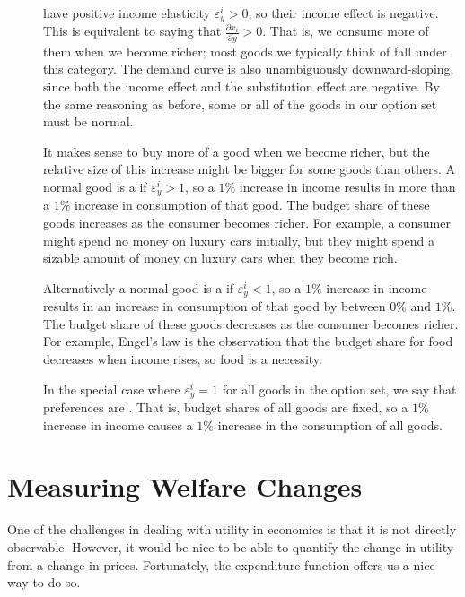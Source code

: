 \begin{description}
\item[] have positive income elasticity $\varepsilon_y^i > 0$, so their income effect is negative. This is equivalent to saying that $\frac{\partial x_i}{\partial y} > 0$. That is, we consume more of them when we become richer; most goods we typically think of fall under this category. The demand curve is also unambiguously downward-sloping, since both the income effect and the substitution effect are negative. By the same reasoning as before, some or all of the goods in our option set must be normal.

It makes sense to buy more of a good when we become richer, but the relative size of this increase might be bigger for some goods than others. A normal good is a  if $\varepsilon_y^i > 1$, so a $1\%$ increase in income results in more than a $1\%$ increase in consumption of that good. The budget share of these goods increases as the consumer becomes richer. For example, a consumer might spend no money on luxury cars initially, but they might spend a sizable amount of money on luxury cars when they become rich.

Alternatively a normal good is a  if $\varepsilon_y^i < 1$, so a $1\%$ increase in income results in an increase in consumption of that good by between $0\%$ and $1\%$. The budget share of these goods decreases as the consumer becomes richer. For example, Engel's law is the observation that the budget share for food decreases when income rises, so food is a necessity.

In the special case where $\varepsilon_y^i = 1$ for all goods in the option set, we say that preferences are . That is, budget shares of all goods are fixed, so a $1\%$ increase in income causes a $1\%$ increase in the consumption of all goods.

\end{description}


\section{Measuring Welfare Changes}
One of the challenges in dealing with utility in economics is that it is not directly observable. However, it would be nice to be able to quantify the change in utility from a change in prices. Fortunately, the expenditure function offers us a nice way to do so.

